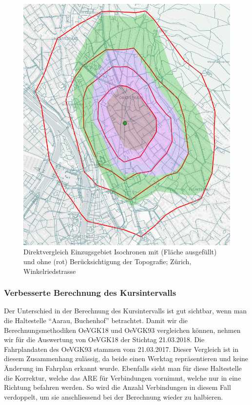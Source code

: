 \begin{figure}[ht]
    \centering
    \includegraphics[width=0.8\linewidth]{technicalreport/img/vergleich_wegfuehrung_isochrone_mit_ohne_topo.png}
    \caption[Direktvergleich Einzugsgebiet Isochronen mit und ohne Topografie]{Direktvergleich Einzugsgebiet Isochronen mit (Fläche ausgefüllt) und ohne (rot) Berücksichtigung der Topografie; Zürich, Winkelriedstrasse}
    \label{fig:vergleich_wegfuehrung_isochrone_mit_ohne_topo}
\end{figure}


\subsubsection{Verbesserte Berechnung des Kursintervalls}

Der Unterschied in der Berechnung des Kursintervalls ist gut sichtbar, wenn man die Haltestelle "`Aarau, Buchenhof"' betrachtet.
Damit wir die Berechnungsmethodiken OeVGK18 und OeVGK93 vergleichen können, nehmen wir für die Auswertung von OeVGK18 der Stichtag 21.03.2018. Die Fahrplandaten des OeVGK93 stammen vom 21.03.2017.
Dieser Vergleich ist in diesem Zusammenhang zulässig, da beide einen Werktag repräsentieren und keine Änderung im Fahrplan erkannt wurde.
Ebenfalls sieht man für diese Haltestelle die Korrektur, welche das \ac{ARE} für Verbindungen vornimmt, welche nur in eine Richtung befahren werden.
So wird die Anzahl Verbindungen in diesem Fall verdoppelt, um sie anschliessend bei der Berechnung wieder zu halbieren.

